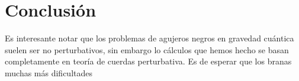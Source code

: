 \chapter{Conclusión}

Es interesante notar que los problemas de agujeros negros en gravedad cuántica suelen ser
no perturbativos, sin embargo lo cálculos que hemos hecho se basan completamente en teoría de 
cuerdas perturbativa.
Es de esperar que los branas muchas más dificultades

